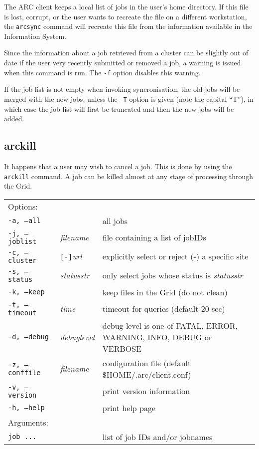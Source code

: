 The ARC client keeps a local list of jobs in the user's home
directory. If this file is lost,
corrupt, or the user wants to recreate the file on a different
workstation, the \texttt{arcsync} command will recreate this file from
the information available in the Information System.

Since  the  information  about  a job retrieved from a cluster can be slightly out of date if the user very recently
submitted or removed a job, a warning is issued when this command is run. The \verb#-f# option disables this warning.

If the job list is not empty when invoking syncronisation, the old jobs will be merged with the new jobs, unless
the \verb#-T# option is given (note the capital ``T''), in which case the job list will first be truncated and then the new jobs will be added.


\subsection{arckill}
\label{sec:arckill}

It happens that a user may wish to cancel a job. This is done by using
the \texttt{arckill}  command. A
job can be killed almost at any stage of processing through the Grid.

\hspace*{0.5cm}
\begin{shaded}
\end{shaded}
\begin{longtable}{llp{8cm}}
   Options:&&\\
   \texttt{-a, --all}& & all jobs\\
   \texttt{-j, --joblist}& \textit{filename} & file containing a list of jobIDs\\
   \texttt{-c, --cluster}&\verb#[-]#\textit{url}&explicitly select or reject (-) a specific site\\
   \texttt{-s, --status}& \textit{statusstr} &only select jobs whose status is \textit{statusstr}\\
   \texttt{-k, --keep}& & keep files in the Grid (do not clean)\\
   \texttt{-t, --timeout}& \textit{time} & timeout for queries (default 20 sec)\\
   \texttt{-d, --debug}& \textit{debuglevel}&debug level is one of  FATAL, ERROR, WARNING, INFO, DEBUG or VERBOSE\\
   \texttt{-z, --conffile}&\textit{filename}& configuration file (default {\$}HOME/.arc/client.conf)\\
   \texttt{-v, --version}& & print version information\\
   \texttt{-h, --help}& & print help page\\
   Arguments:&&\\
   \texttt{job ...} && list of job IDs and/or jobnames\\
\end{longtable}

